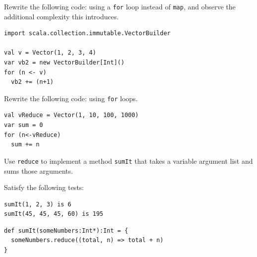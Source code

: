 \documentclass[a4paper,12pt]{exam}
\begin{document}
\begin{questions}

\question
Rewrite the following code:
using a \texttt{for} loop instead of \texttt{map}, 
and observe the additional complexity this introduces.

\begin{solution}
\begin{Verbatim}
import scala.collection.immutable.VectorBuilder

val v = Vector(1, 2, 3, 4)
var vb2 = new VectorBuilder[Int]()
for (n <- v)
  vb2 += (n+1)	
\end{Verbatim}	
\end{solution}

\question
Rewrite the following code:
using \texttt{for} loops.

\begin{solution}
\begin{Verbatim}
val vReduce = Vector(1, 10, 100, 1000)
var sum = 0
for (n<-vReduce)
  sum += n	
\end{Verbatim}	
\end{solution}

\question
Use \texttt{reduce} to implement a method \texttt{sumIt} that takes a 
variable argument list and sums those arguments. 

Satisfy the following tests:
\begin{Verbatim}
sumIt(1, 2, 3) is 6
sumIt(45, 45, 45, 60) is 195
\end{Verbatim}

\begin{solution}
\begin{Verbatim}
def sumIt(someNumbers:Int*):Int = {
  someNumbers.reduce((total, n) => total + n)
}	
\end{Verbatim}	
\end{solution}


\end{questions}
\end{document}
